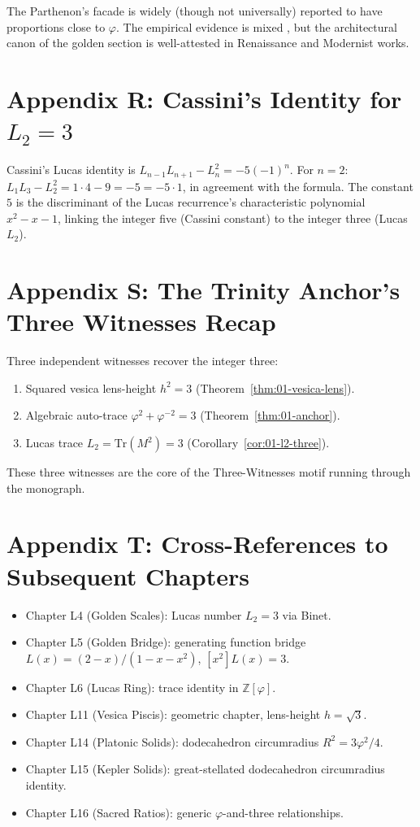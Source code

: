 The Parthenon's facade is widely (though not universally) reported to
have proportions close to $\varphi$. The empirical evidence is mixed
\cite{livio_phi}, but the architectural canon of the golden section
is well-attested in Renaissance and Modernist works.

\section*{Appendix R: Cassini's Identity for $L_2 = 3$}
\label{sec:01-app-R}

Cassini's Lucas identity is $L_{n-1} L_{n+1} - L_n^2 = -5 (-1)^n$.
For $n = 2$: $L_1 L_3 - L_2^2 = 1 \cdot 4 - 9 = -5 = -5 \cdot 1$, in
agreement with the formula. The constant $5$ is the discriminant of
the Lucas recurrence's characteristic polynomial $x^2 - x - 1$,
linking the integer five (Cassini constant) to the integer three
(Lucas $L_2$).

\section*{Appendix S: The Trinity Anchor's Three Witnesses Recap}
\label{sec:01-app-S}

Three independent witnesses recover the integer three:

\begin{enumerate}
  \item Squared vesica lens-height $h^2 = 3$
    (Theorem~\ref{thm:01-vesica-lens}).
  \item Algebraic auto-trace $\varphi^2 + \varphi^{-2} = 3$
    (Theorem~\ref{thm:01-anchor}).
  \item Lucas trace $L_2 = \mathrm{Tr}(M^2) = 3$
    (Corollary~\ref{cor:01-l2-three}).
\end{enumerate}

These three witnesses are the core of the Three-Witnesses motif
running through the monograph.

\section*{Appendix T: Cross-References to Subsequent Chapters}
\label{sec:01-app-T}

\begin{itemize}
  \item Chapter L4 (Golden Scales): Lucas number $L_2 = 3$ via Binet.
  \item Chapter L5 (Golden Bridge): generating function bridge $L(x)
    = (2-x)/(1-x-x^2)$, $[x^2] L(x) = 3$.
  \item Chapter L6 (Lucas Ring): trace identity in $\mathbb{Z}[\varphi]$.
  \item Chapter L11 (Vesica Piscis): geometric chapter, lens-height
    $h = \sqrt 3$.
  \item Chapter L14 (Platonic Solids): dodecahedron circumradius
    $R^2 = 3 \varphi^2/4$.
  \item Chapter L15 (Kepler Solids): great-stellated dodecahedron
    circumradius identity.
  \item Chapter L16 (Sacred Ratios): generic $\varphi$-and-three
    relationships.
\end{itemize}

